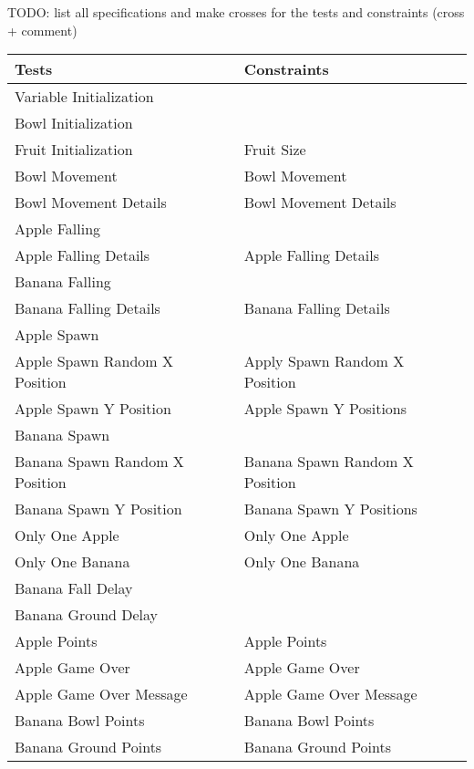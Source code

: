 TODO: list all specifications and make crosses for the tests and constraints (cross + comment)
\begin{table}
    \centering
    \scriptsize
    \begin{tabular}{ll}
        \toprule
        Tests                          & Constraints\\
        \midrule
        Variable Initialization        & \\
        Bowl Initialization            & \\
        Fruit Initialization           & Fruit Size\\
        Bowl Movement                  & Bowl Movement\\
        Bowl Movement Details          & Bowl Movement Details\\
        Apple Falling                  & \\
        Apple Falling Details          & Apple Falling Details\\
        Banana Falling                 & \\
        Banana Falling Details         & Banana Falling Details\\
        Apple Spawn                    & \\
        Apple Spawn Random X Position  & Apply Spawn Random X Position\\
        Apple Spawn Y Position         & Apple Spawn Y Positions\\
        Banana Spawn                   & \\
        Banana Spawn Random X Position & Banana Spawn Random X Position\\
        Banana Spawn Y Position        & Banana Spawn Y Positions\\
        Only One Apple                 & Only One Apple\\
        Only One Banana                & Only One Banana\\
        Banana Fall Delay              & \\
        Banana Ground Delay            & \\
        Apple Points                   & Apple Points\\
        Apple Game Over                & Apple Game Over\\
        Apple Game Over Message        & Apple Game Over Message\\
        Banana Bowl Points             & Banana Bowl Points\\
        Banana Ground Points           & Banana Ground Points\\

\end{tabular}
\end{table}
